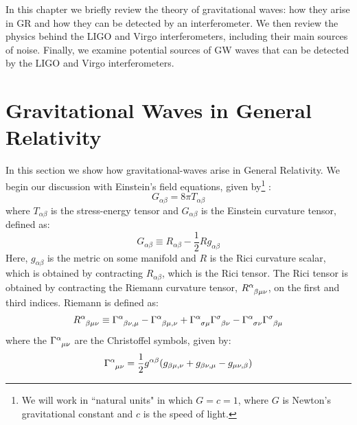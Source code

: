 \def\qI{\ensuremath{\mathcal{I}}}
\def\TT{\ensuremath{\mathrm{TT}}}
\def\fGW{\ensuremath{f_{\mathrm{GW}}}}

In this chapter we briefly review the theory of gravitational waves: how they arise in \ac{GR} and how they can be detected by an interferometer. We then review the physics behind the \ac{LIGO} and Virgo interferometers, including their main sources of noise. Finally, we examine potential sources of \ac{GW} waves that can be detected by the \ac{LIGO} and Virgo interferometers.

\section{Gravitational Waves in General Relativity}
\label{sec:gr}

In this section we show how gravitational-waves arise in General Relativity. We begin our discussion with Einstein's field equations, given by\footnote{We will work in ``natural units" in which $G = c = 1$, where $G$ is Newton's gravitational constant and $c$ is the speed of light.} \cite{ref:Einstein}:
\begin{equation}
\label{eqn:einstein_field_eqns}
G_{\alpha\beta} = 8\pi T_{\alpha \beta}
\end{equation}
where $T_{\alpha\beta}$ is the stress-energy tensor and $G_{\alpha\beta}$ is the Einstein curvature tensor, defined as:
\begin{equation}
G_{\alpha\beta} \equiv R_{\alpha \beta} - \frac{1}{2}R g_{\alpha\beta}
\end{equation}
Here, $g_{\alpha\beta}$ is the metric on some manifold and $R$ is the Rici curvature scalar, which is obtained by contracting $R_{\alpha\beta}$, which is the Rici tensor. The Rici tensor is obtained by contracting the Riemann curvature tensor, $R\indices{^\alpha_{\beta\mu\nu}}$, on the first and third indices. Riemann is defined as:
\begin{equation}
R\indices{^\alpha_{\beta\mu\nu}} \equiv \Gamma\indices{^\alpha_{\beta\nu,\mu}} - \Gamma\indices{^\alpha_{\beta\mu,\nu}} + \Gamma\indices{^\alpha_{\sigma\mu}}\Gamma\indices{^\sigma_{\beta\nu}} - \Gamma\indices{^\alpha_{\sigma\nu}}\Gamma\indices{^\sigma_{\beta\mu}}
\end{equation}
where the $\Gamma\indices{^\alpha_{\mu\nu}}$ are the Christoffel symbols, given by:
\begin{equation}
\Gamma\indices{^\alpha_{\mu\nu}} = \frac{1}{2}g^{\alpha\beta}(g_{\beta\mu,\nu} + g_{\beta\nu,\mu} - g_{\mu\nu,\beta})
\end{equation}
